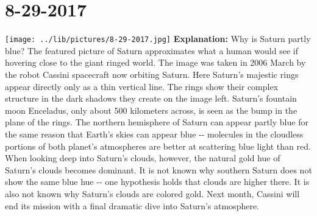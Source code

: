 \documentclass{article}%
\begin{document}
%
\normalsize%
\section{8{-}29{-}2017}%
\texttt{[image: ../lib/pictures/8-29-2017.jpg]}%
\textbf{\newline%
\newline%
Explanation:\newline%
}%
    Why is Saturn partly blue?   The  featured picture  of Saturn approximates what a  human  would see if hovering close to the giant ringed world.      The image  was taken in 2006 March by the robot  Cassini spacecraft now orbiting  Saturn.    Here Saturn's majestic rings appear directly only as a thin vertical line.    The rings show their complex structure in the dark shadows they create on the image left.     Saturn's fountain moon Enceladus,  only about 500 kilometers across, is seen as the bump in the plane of the rings.    The northern hemisphere of  Saturn can appear partly blue for the same reason that  Earth's skies can appear blue {-}{-} molecules in the cloudless portions  of both planet's atmospheres are better at scattering blue light than red.    When looking deep into  Saturn's clouds, however, the natural  gold hue of Saturn's clouds becomes dominant.     It is not known why southern Saturn does not show the same blue hue {-}{-}  one hypothesis holds that clouds are higher there.      It is also  not known why Saturn's  clouds are colored gold.  Next month, Cassini will  end its mission with a final  dramatic dive into Saturn's atmosphere.

%
\end{document}
